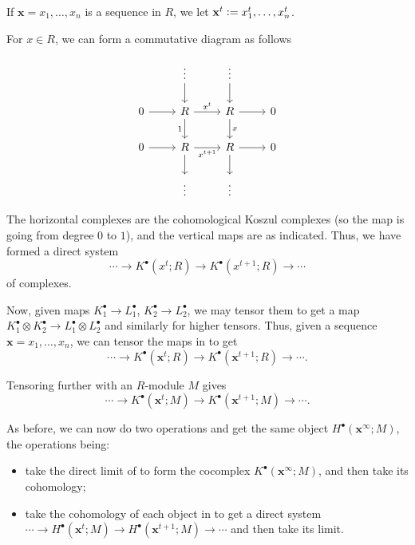 \documentclass[12pt]{article}
\begin{document}
If $\mathbf{x} = x_{1}, \ldots, x_{n}$ is a sequence in $R$, we let $\mathbf{x}^{t} \vcentcolon= x_{1}^{t}, \ldots, x_{n}^{t}$. 

For $x \in R$, we can form a commutative diagram as follows


\begin{equation*} 
	\begin{tikzcd}
            & \vdots \arrow[d]                    & \vdots \arrow[d]      &   \\
		0 \arrow[r] & R \arrow[r, "x^{t}"] \arrow[d, "1"'] & R \arrow[d, "x"] \arrow[r] & 0 \\
		0 \arrow[r] & R \arrow[r, "x^{t + 1}"'] \arrow[d] & R \arrow[d] \arrow[r] & 0 \\
		            & \vdots                              & \vdots                &  
	\end{tikzcd}
\end{equation*}

The horizontal complexes are the cohomological Koszul complexes (so the map is going from degree $0$ to $1$), and the vertical maps are as indicated. Thus, we have formed a direct system
\begin{equation} \label{eq:003}
	\cdots \to K^{\bullet}(x^{t}; R) \to K^{\bullet}(x^{t + 1}; R) \to \cdots
\end{equation}
of complexes.

Now, given maps $K_{1}^{\bullet} \to L_{1}^{\bullet}$, $K_{2}^{\bullet} \to L_{2}^{\bullet}$, we may tensor them to get a map $K_{1}^{\bullet} \otimes K_{2}^{\bullet} \to L_{1}^{\bullet} \otimes L_{2}^{\bullet}$ and similarly for higher tensors. Thus, given a sequence $\mathbf{x} = x_{1}, \ldots, x_{n}$, we can tensor the maps in  to get 
\begin{equation*}
	\cdots \to K^{\bullet}(\mathbf{x}^{t}; R) \to K^{\bullet}(\mathbf{x}^{t + 1}; R) \to \cdots.
\end{equation*}

Tensoring further with an $R$-module $M$ gives
\begin{equation} \label{eq:004}
	\cdots \to K^{\bullet}(\mathbf{x}^{t}; M) \to K^{\bullet}(\mathbf{x}^{t + 1}; M) \to \cdots.
\end{equation}

As before, we can now do two operations and get the same object $H^{\bullet}(\mathbf{x}^{\infty}; M)$, the operations being:
\begin{itemize}
	\item take the direct limit of  to form the cocomplex $K^{\bullet}(\mathbf{x}^{\infty}; M)$, and then take its cohomology;
	\item take the cohomology of each object in  to get a direct system $\cdots \to H^{\bullet}(\mathbf{x}^{t}; M) \to H^{\bullet}(\mathbf{x}^{t + 1}; M) \to \cdots$ and then take its limit.
\end{itemize}
\end{document}
